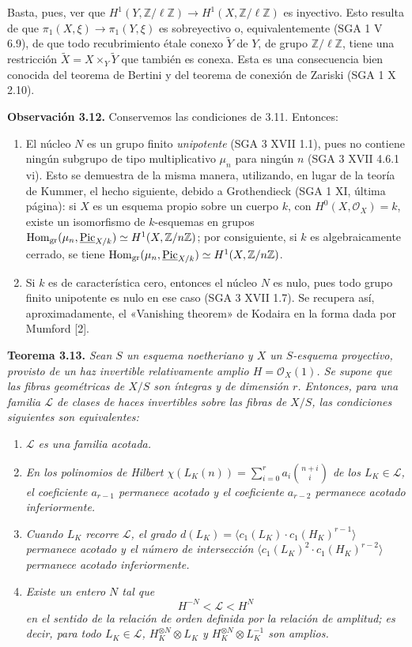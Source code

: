 Basta, pues, ver que
$H^1(Y,\mathbb Z/\ell\mathbb Z)\longrightarrow
H^1(X,\mathbb Z/\ell\mathbb Z)$ es inyectivo. Esto resulta de que
$\pi_1(X,\xi)\to\pi_1(Y,\xi)$ es sobreyectivo o, equivalentemente (SGA 1 V
6.9), de que todo recubrimiento étale conexo $\widetilde Y$ de $Y$, de grupo
$\mathbb Z/\ell\mathbb Z$, tiene una restricción
$\widetilde X=X\times_Y\widetilde Y$ que también es conexa. Esta es una
consecuencia bien conocida del teorema de Bertini y del teorema de conexión
de Zariski (SGA 1 X 2.10).

\textbf{Observación 3.12.} Conservemos las condiciones de 3.11. Entonces:
\begin{enumerate}[label=(\roman*)]
\item El núcleo $N$ es un grupo finito \emph{unipotente} (SGA 3 XVII 1.1),
pues no contiene ningún subgrupo de tipo multiplicativo $\mu_n$ para ningún
$n$ (SGA 3 XVII 4.6.1 vi). Esto se demuestra de la misma manera, utilizando,
en lugar de la teoría de Kummer, el hecho siguiente, debido a Grothendieck
(SGA 1 XI, última página): si $X$ es un esquema propio sobre un cuerpo $k$,
con $H^0(X,\mathcal O_X)=k$, existe un isomorfismo de $k$-esquemas en grupos
$\operatorname{Hom}_{\mathrm{gr}}(\mu_n,\underline{\operatorname{Pic}}_{X/k})\simeq
H^1(X,\mathbb Z/n\mathbb Z)$; por consiguiente, si $k$ es algebraicamente
cerrado, se tiene
$\operatorname{Hom}_{\mathrm{gr}}(\mu_n,\underline{\operatorname{Pic}}_{X/k})\simeq
H^1(X,\mathbb Z/n\mathbb Z)$.
\item Si $k$ es de característica cero, entonces el núcleo $N$ es nulo,
pues todo grupo finito unipotente es nulo en ese caso (SGA 3 XVII 1.7). Se
recupera así, aproximadamente, el «Vanishing theorem» de Kodaira en la forma
dada por Mumford [2].
\end{enumerate}

\textbf{Teorema 3.13.} \emph{Sean $S$ un esquema noetheriano y $X$ un
$S$-esquema proyectivo, provisto de un haz invertible relativamente amplio
$H=\mathcal O_X(1)$. Se supone que las fibras geométricas de $X/S$ son
íntegras y de dimensión $r$. Entonces, para una familia $\mathcal L$ de
clases de haces invertibles sobre las fibras de $X/S$, las condiciones
siguientes son equivalentes:}
\begin{enumerate}[label=(\roman*)]
\item \emph{$\mathcal L$ es una familia acotada.}
\item \emph{En los polinomios de Hilbert
$\chi(L_K(n))=\sum_{i=0}^{r}a_i\binom{n+i}{i}$ de los
$L_K\in\mathcal L$, el coeficiente $a_{r-1}$ permanece acotado y el
coeficiente $a_{r-2}$ permanece acotado inferiormente.}
\item \emph{Cuando $L_K$ recorre $\mathcal L$, el grado
$d(L_K)=\langle c_1(L_K)\cdot c_1(H_K)^{r-1}\rangle$ permanece acotado y el
número de intersección
$\langle c_1(L_K)^2\cdot c_1(H_K)^{r-2}\rangle$ permanece acotado
inferiormente.}
\item \emph{Existe un entero $N$ tal que}
\[
H^{-N}<\mathcal L<H^N
\]
\emph{en el sentido de la relación de orden definida por la relación de
amplitud; es decir, para todo $L_K\in\mathcal L$,
$H_K^{\otimes N}\otimes L_K$ y $H_K^{\otimes N}\otimes L_K^{-1}$ son
amplios.}
\end{enumerate}

